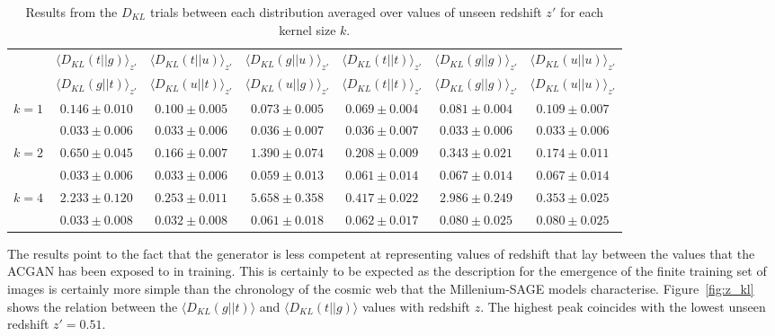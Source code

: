 \documentclass[twocolumn]{article}
\numberwithin{equation}{section}
\begin{document}
\begin{table}[t]
  \centering
  \begin{tabular}{|ccccccc|}
    \hline\hline
          & $\langle D_{KL}(t||g) \rangle_{z'}$ & $\langle D_{KL}(t||u) \rangle_{z'}$ & $\langle D_{KL}(g||u)\rangle_{z'}$ & $\langle D_{KL}(t||t)\rangle_{z'}$ & $\langle D_{KL}(g||g) \rangle_{z'}$ & $\langle D_{KL}(u||u) \rangle_{z'}$ \\ 
          &  $\langle D_{KL}(g||t)\rangle_{z'}$ & $\langle D_{KL}(u||t)\rangle_{z'}$ & $\langle D_{KL}(u||g)\rangle_{z'}$ & $\langle D_{KL}(t||t) \rangle_{z'}$ & $\langle D_{KL}(g||g)\rangle_{z'}$  & $\langle D_{KL}(u||u)\rangle_{z'}$ \\ [1.0ex]
    \hline\hline
    
    $k=1$ & $0.146\pm0.010$ & $0.100\pm0.005$ & $0.073\pm0.005$ & $0.069\pm0.004$ & $0.081\pm0.004$ & $0.109\pm0.007$ \\
          & $0.033\pm0.006$ & $0.033\pm0.006$ & $0.036\pm0.007$ & $0.036\pm0.007$ & $0.033\pm0.006$ & $0.033\pm0.006$ \\
          [1ex]
    
    $k=2$ & $0.650\pm0.045$ & $0.166\pm0.007$ & $1.390\pm0.074$ & $0.208\pm0.009$ & $0.343\pm0.021$ & $0.174\pm0.011$ \\
          & $0.033\pm0.006$ & $0.033\pm0.006$ & $0.059\pm0.013$ & $0.061\pm0.014$ & $0.067\pm0.014$ & $0.067\pm0.014$ \\
          [1ex]
               
    $k=4$ & $2.233\pm0.120$ & $0.253\pm0.011$ & $5.658\pm0.358$ & $0.417\pm0.022$ & $2.986\pm0.249$ & $0.353\pm0.025$ \\
          & $0.033\pm0.008$ & $0.032\pm0.008$ & $0.061\pm0.018$ & $0.062\pm0.017$ & $0.080\pm0.025$ & $0.080\pm0.025$ \\
          [1ex]
    \hline\hline
  \end{tabular}
  \caption{Results from the $D_{KL}$ trials between each distribution averaged over values of unseen redshift $z'$ for each 
           kernel size $k$.}
  \label{tab:2}
\end{table}

The results point to the fact that the generator is less competent at representing values of redshift that lay between the
values that the ACGAN has been exposed to in training. This is certainly to be expected as the description for the emergence
of the finite training set of images is certainly more simple than the chronology of the cosmic web that the Millenium-SAGE
models characterise. Figure~\ref{fig:z_kl} shows the relation between the $\langle D_{KL}(g||t) \rangle$ and 
$\langle D_{KL}(t||g) \rangle$ values with redshift $z$. The highest peak coincides with the lowest unseen redshift $z'=0.51$.
\end{document}
